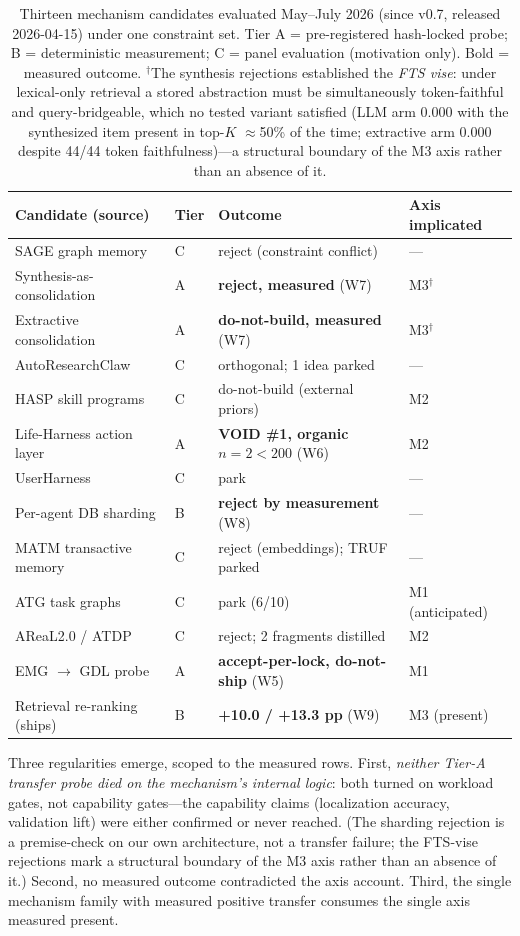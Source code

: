 \documentclass[11pt]{article}
\begin{document}
\begin{table}[t]
\centering
\small
\begin{tabular}{@{}llll@{}}
\toprule
Candidate (source) & Tier & Outcome & Axis implicated \\
\midrule
SAGE graph memory & C & reject (constraint conflict) & --- \\
Synthesis-as-consolidation & A & \textbf{reject, measured} (W7) & M3$^{\dagger}$ \\
Extractive consolidation & A & \textbf{do-not-build, measured} (W7) & M3$^{\dagger}$ \\
AutoResearchClaw & C & orthogonal; 1 idea parked & --- \\
HASP skill programs & C & do-not-build (external priors) & M2 \\
Life-Harness action layer & A & \textbf{VOID \#1, organic $n{=}2 < 200$} (W6) & M2 \\
UserHarness & C & park & --- \\
Per-agent DB sharding & B & \textbf{reject by measurement} (W8) & --- \\
MATM transactive memory & C & reject (embeddings); TRUF parked & --- \\
ATG task graphs & C & park (6/10) & M1 (anticipated) \\
AReaL2.0 / ATDP & C & reject; 2 fragments distilled & M2 \\
EMG $\rightarrow$ GDL probe & A & \textbf{accept-per-lock, do-not-ship} (W5) & M1 \\
Retrieval re-ranking (ships) & B & \textbf{+10.0 / +13.3 pp} (W9) & M3 (present) \\
\bottomrule
\end{tabular}
\caption{Thirteen mechanism candidates evaluated May--July 2026 (since v0.7, released 2026-04-15) under one constraint set. Tier A = pre-registered hash-locked probe; B = deterministic measurement; C = panel evaluation (motivation only). Bold = measured outcome. $^{\dagger}$The synthesis rejections established the \emph{FTS vise}: under lexical-only retrieval a stored abstraction must be simultaneously token-faithful and query-bridgeable, which no tested variant satisfied (LLM arm 0.000 with the synthesized item present in top-$K$ $\approx$50\% of the time; extractive arm 0.000 despite 44/44 token faithfulness)---a structural boundary of the M3 axis rather than an absence of it.}
\label{tab:ledger}
\end{table}

Three regularities emerge, scoped to the measured rows. First, \emph{neither Tier-A transfer probe died on the mechanism's internal logic}: both turned on workload gates, not capability gates---the capability claims (localization accuracy, validation lift) were either confirmed or never reached. (The sharding rejection is a premise-check on our own architecture, not a transfer failure; the FTS-vise rejections mark a structural boundary of the M3 axis rather than an absence of it.) Second, no measured outcome contradicted the axis account. Third, the single mechanism family with measured positive transfer consumes the single axis measured present.
\end{document}
